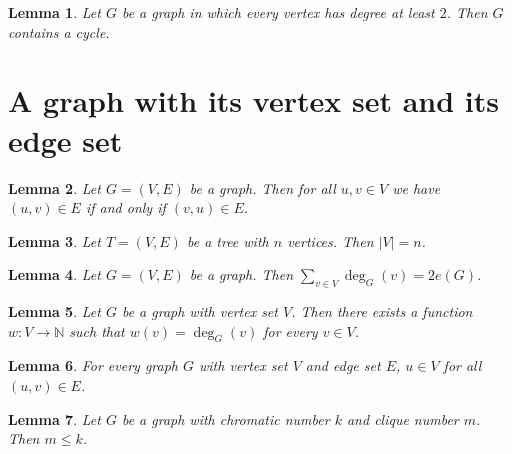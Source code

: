 \documentclass{article}
\newtheorem{lemma}{Lemma}
\begin{document}
\begin{lemma}\label{degree-bounds}
Let $G$ be a graph in which every vertex has degree at least $2$. Then $G$ contains a cycle.
\end{lemma}

\section{A graph with its vertex set and its edge set}

\begin{lemma}\label{parts}
Let $G=(V,E)$ be a graph. Then for all $u,v\in V$ we have $(u,v)\in E$ if and only if $(v,u)\in E$.
\end{lemma}

\begin{lemma}\label{parts-tree}
Let $T=(V,E)$ be a tree with $n$ vertices. Then $|V|=n$.
\end{lemma}

\begin{lemma}\label{parts-degrees}
Let $G=(V,E)$ be a graph. Then $\sum_{v\in V}\deg_G(v)=2e(G)$.
\end{lemma}

\begin{lemma}\label{with-vertex-set}
Let $G$ be a graph with vertex set $V$. Then there exists a function $w\colon V\to\mathbb{N}$ such that $w(v)=\deg_G(v)$ for every $v\in V$.
\end{lemma}

\begin{lemma}\label{with-both}
For every graph $G$ with vertex set $V$ and edge set $E$, $u\in V$ for all $(u,v)\in E$.
\end{lemma}

\begin{lemma}\label{with-numbers}
Let $G$ be a graph with chromatic number $k$ and clique number $m$. Then $m\le k$.
\end{lemma}
\end{document}
